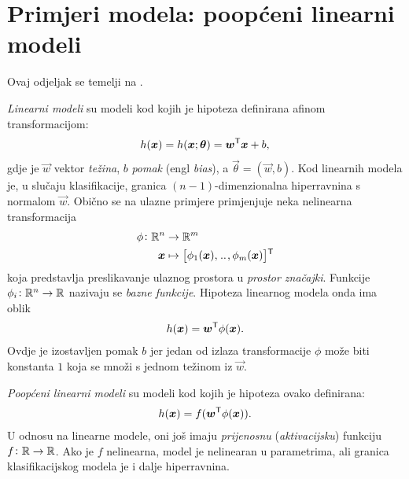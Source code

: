 \documentclass[utf8, diplomski, lmodern]{fer}
\begin{document}


\section{Primjeri modela: poopćeni linearni modeli} \label{sec:poopceni-linearni-modeli}

Ovaj odjeljak se temelji na \citep{Snajder:2014:SU}.

\emph{Linearni modeli} su modeli kod kojih je hipoteza definirana afinom transformacijom:
\begin{align}
h(\vec x) = h(\vec x;\vec\theta) = \vec w^\tp\vec x + b \text{,}
\end{align}
gdje je $\vec w$ vektor \emph{težina}, $b$ \emph{pomak} (engl \textit{bias}), a $\vec\theta=(\vec w, b)$. Kod linearnih modela je, u slučaju klasifikacije, granica $(n-1)$-dimenzionalna hiperravnina s normalom $\vec w$. Obično se na ulazne primjere primjenjuje neka nelinearna transformacija
\begin{align*}
\phi \colon \R^n &\to \R^m \\
\vec x &\mapsto \sbr{\phi_1(\vec x),\bidot,\phi_m(\vec x)}^\tp
\end{align*}
koja predstavlja preslikavanje ulaznog prostora u \emph{prostor značajki}. Funkcije $\phi_i \colon \mathbb{R}^n \to \mathbb{R}$ nazivaju se \emph{bazne funkcije}. Hipoteza linearnog modela onda ima oblik
\begin{align}
h(\vec x) = \vec w^\tp\phi(\vec x) \text{.}
\end{align}
Ovdje je izostavljen pomak $b$ jer jedan od izlaza transformacije $\phi$ može biti konstanta $1$ koja se množi s jednom težinom iz $\vec w$. 

\emph{Poopćeni linearni modeli} su modeli kod kojih je hipoteza ovako definirana:
\begin{align} \label{eq:poopceni-linearni-model}
h(\vec x) = f(\vec w^\tp\phi(\vec x)) \text{.}
\end{align}
U odnosu na linearne modele, oni još imaju \emph{prijenosnu} (\emph{aktivacijsku}) funkciju $f \colon \mathbb{R} \to \mathbb{R}$. Ako je $f$ nelinearna, model je nelinearan u parametrima, ali granica klasifikacijskog modela je i dalje hiperravnina.
\end{document}
